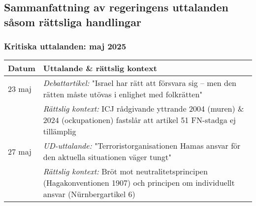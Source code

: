 
\subsection{Sammanfattning av regeringens uttalanden såsom rättsliga handlingar}
\label{subsec:regeringens_positioner}

\subsubsection{Kritiska uttalanden: maj 2025}
\begin{tabular}{p{}p{}}
\textbf{Datum} & \textbf{Uttalande \& rättslig kontext} \\
\hline
23 maj & \textit{Debattartikel:} "Israel har rätt att försvara sig – men den rätten måste utövas i enlighet med folkrätten" \\
& \footnotesize\textit{Rättslig kontext:} ICJ rådgivande yttrande 2004 (muren) \& 2024 (ockupationen) fastslår att artikel 51 FN-stadga ej tillämplig \\
\hline
27 maj & \textit{UD-uttalande:} "Terroristorganisationen Hamas ansvar för den aktuella situationen väger tungt" \\
& \footnotesize\textit{Rättslig kontext:} Bröt mot neutralitetsprincipen (Hagakonventionen 1907) och principen om individuellt ansvar (Nürnbergartikel 6) \\
\end{tabular}

